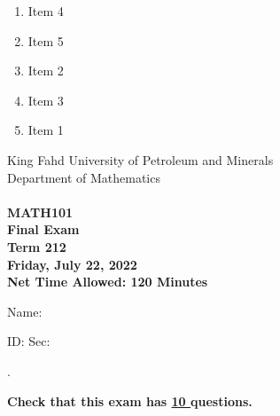 \documentclass[amsfonts,bezier,leqno,fleqn,12pt,a4paper]{article}
\begin{document}
{{\begin{large}
\begin{enumerate}
\begin{enumerate}
\item  Item 4
\item  Item 5
\item  Item 2
\item  Item 3
\item  Item 1

\end{enumerate}
\newpage


\end{enumerate}
\end{large}


\newpage


\thispagestyle{empty}
\begin{center}
    \begin{large}
        King Fahd University of Petroleum and Minerals \\ 
        Department of Mathematics  \\ 
        \vspace*{4.5cm}
        {\bf {} }  \hfill {\bf {}} \\
        {\bf MATH101 }  \\
        {\bf Final Exam }  \\
        {\bf Term 212 }  \\
        {\bf Friday, July 22, 2022 }  \\ 
        {\bf Net Time Allowed: 120 Minutes }  \\
        \vspace*{0.2cm}

    \end{large}
\end{center}

\large{Name:  }\hrulefill

\vspace{3mm}

\large{ID: } \hrulefill \large{  Sec: } \hrulefill \large{.

\vspace{1cm}

\large{\bf{Check that this exam has {\underline{ 10 }} questions.}}

\vspace{1cm}

}}}
\end{document}
